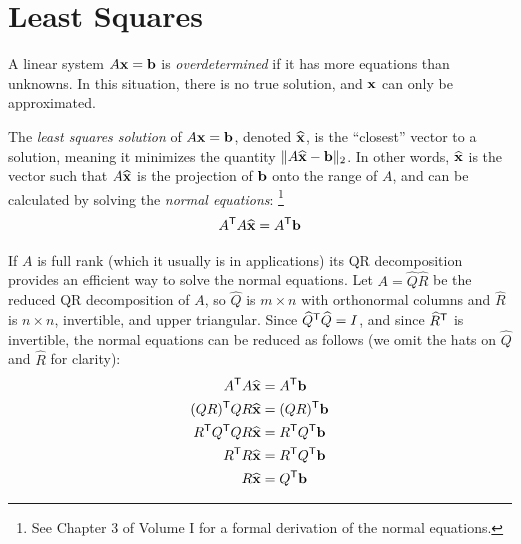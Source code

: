 \label{lab:qr-applications}

\section*{Least Squares} %

A linear system $A\mathbf{x} = \mathbf{b}$ is \emph{overdetermined} if it has more equations than unknowns.
In this situation, there is no true solution, and $\mathbf{x}$ can only be approximated.

The \emph{least squares solution} of $A\mathbf{x} = \mathbf{b}$, denoted $\widehat{\mathbf{x}}$, is the ``closest'' vector to a solution, meaning it minimizes the quantity $\|A\widehat{\mathbf{x}} - \mathbf{b}\|_2$.
In other words, $\widehat{\mathbf{x}}$ is the vector such that $A\widehat{\mathbf{x}}$ is the projection of $\mathbf{b}$ onto the range of $A$, and can be calculated by solving the \emph{normal equations}:%
\footnote{See Chapter 3 of Volume I for a formal derivation of the normal equations.}
\[A^{\mathsf T} A\widehat{\mathbf{x}} = A^{\mathsf T} \mathbf{b}\]

If $A$ is full rank (which it usually is in applications) its QR decomposition provides an efficient way to solve the normal equations.
Let $A = \widehat{Q}\widehat{R}$ be the reduced QR decomposition of $A$, so $\widehat{Q}$ is $m \times n$ with orthonormal columns and $\widehat{R}$ is $n \times n$, invertible, and upper triangular.
Since $\widehat{Q}^{\mathsf T} \widehat{Q} = I$, and since $\widehat{R}^{\mathsf T}$ is invertible, the normal equations can be reduced as follows (we omit the hats on $\widehat{Q}$ and $\widehat{R}$ for clarity):
%
\begin{align}
\nonumber
A^{\mathsf T} A\widehat{\mathbf{x}} &= A^{\mathsf T} \mathbf{b} \\ \nonumber
(Q R)^{\mathsf T} Q R  \widehat{\mathbf{x}}
&= (Q R)^{\mathsf T} \mathbf{b} \\ \nonumber
 R^{\mathsf T} Q^{\mathsf T} Q R  \widehat{\mathbf{x}}
&=  R^{\mathsf T} Q^{\mathsf T} \mathbf{b} \\ \nonumber
 R^{\mathsf T} R \widehat{\mathbf{x}}
&=  R^{\mathsf T} Q^{\mathsf T} \mathbf{b} \\
 R \widehat{\mathbf{x}}
&= Q^{\mathsf T} \mathbf{b} \label{eq:normal-equation-via-qr}
\end{align}

